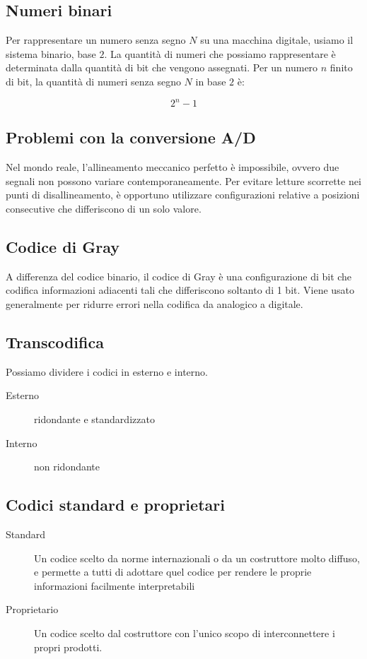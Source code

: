 \documentclass{subfiles}
\begin{document}
\subsection{Numeri binari}

Per rappresentare un numero senza segno $N$ su una macchina digitale, usiamo il sistema binario, base $2$.
La quantità di numeri che possiamo rappresentare è determinata dalla quantità di bit che vengono assegnati.
Per un numero $n$ finito di bit, la quantità di numeri senza segno $N$ in base $2$ è:

$$
2^n - 1
$$

\subsection{Problemi con la conversione A/D}

Nel mondo reale, l'allineamento meccanico perfetto è impossibile, ovvero due segnali non possono variare contemporaneamente.
Per evitare letture scorrette nei punti di disallineamento, è opportuno utilizzare configurazioni relative a posizioni consecutive che differiscono di un solo valore.

\subsection{Codice di Gray}

A differenza del codice binario, il codice di Gray è una configurazione di bit che codifica informazioni adiacenti tali che differiscono soltanto di 1 bit.
Viene usato generalmente per ridurre errori nella codifica da analogico a digitale.

\subsection{Transcodifica}

Possiamo dividere i codici in esterno e interno.

\begin{description}
	\item[Esterno] ridondante e standardizzato
	\item[Interno] non ridondante
\end{description}

\subsection{Codici standard e proprietari}

\begin{description}
    \item[Standard] Un codice scelto da norme internazionali o da un costruttore molto diffuso, e permette a tutti di adottare quel codice per rendere le proprie informazioni facilmente interpretabili
    \item[Proprietario] Un codice scelto dal costruttore con l'unico scopo di interconnettere i propri prodotti.
\end{description}
\end{document}
